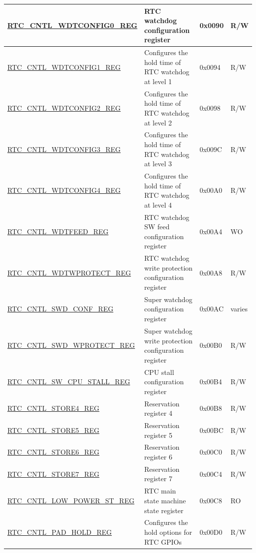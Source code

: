 \begin{longtable}{ | l | p{7cm} | p{1.3cm} | p{1cm} | }
\hyperref[regdesc:RTCCNTLWDTCONFIG0REG]{RTC\_CNTL\_WDTCONFIG0\_REG} & RTC watchdog configuration register & 0x0090 & R/W \\ \hline
\hyperref[regdesc:RTCCNTLWDTCONFIG1REG]{RTC\_CNTL\_WDTCONFIG1\_REG} & Configures the hold time of RTC watchdog at level 1 & 0x0094 & R/W \\ \hline
\hyperref[regdesc:RTCCNTLWDTCONFIG2REG]{RTC\_CNTL\_WDTCONFIG2\_REG} & Configures the hold time of RTC watchdog at level 2 & 0x0098 & R/W \\ \hline
\hyperref[regdesc:RTCCNTLWDTCONFIG3REG]{RTC\_CNTL\_WDTCONFIG3\_REG} & Configures the hold time of RTC watchdog at level 3 & 0x009C & R/W \\ \hline
\hyperref[regdesc:RTCCNTLWDTCONFIG4REG]{RTC\_CNTL\_WDTCONFIG4\_REG} & Configures the hold time of RTC watchdog at level 4 & 0x00A0 & R/W \\ \hline
\hyperref[regdesc:RTCCNTLWDTFEEDREG]{RTC\_CNTL\_WDTFEED\_REG} & RTC watchdog SW feed configuration register & 0x00A4 & WO \\ \hline
\hyperref[regdesc:RTCCNTLWDTWPROTECTREG]{RTC\_CNTL\_WDTWPROTECT\_REG} & RTC watchdog write protection configuration register & 0x00A8 & R/W \\ \hline
\hyperref[regdesc:RTCCNTLSWDCONFREG]{RTC\_CNTL\_SWD\_CONF\_REG} & Super watchdog configuration register & 0x00AC & varies \\ \hline
\hyperref[regdesc:RTCCNTLSWDWPROTECTREG]{RTC\_CNTL\_SWD\_WPROTECT\_REG} & Super watchdog write protection configuration register & 0x00B0 & R/W \\ \hline
\hyperref[regdesc:RTCCNTLSWCPUSTALLREG]{RTC\_CNTL\_SW\_CPU\_STALL\_REG} & CPU stall configuration register & 0x00B4 & R/W \\ \hline
\hyperref[regdesc:RTCCNTLSTORE4REG]{RTC\_CNTL\_STORE4\_REG} & Reservation register 4 & 0x00B8 & R/W \\ \hline
\hyperref[regdesc:RTCCNTLSTORE5REG]{RTC\_CNTL\_STORE5\_REG} & Reservation register 5 & 0x00BC & R/W \\ \hline
\hyperref[regdesc:RTCCNTLSTORE6REG]{RTC\_CNTL\_STORE6\_REG} & Reservation register 6 & 0x00C0 & R/W \\ \hline
\hyperref[regdesc:RTCCNTLSTORE7REG]{RTC\_CNTL\_STORE7\_REG} & Reservation register 7 & 0x00C4 & R/W \\ \hline
\hyperref[regdesc:RTCCNTLLOWPOWERSTREG]{RTC\_CNTL\_LOW\_POWER\_ST\_REG} & RTC main state machine state register  & 0x00C8 & RO \\ \hline
\hyperref[regdesc:RTCCNTLPADHOLDREG]{RTC\_CNTL\_PAD\_HOLD\_REG} & Configures the hold options for RTC GPIOs & 0x00D0 & R/W \\ \hline

\end{longtable}
